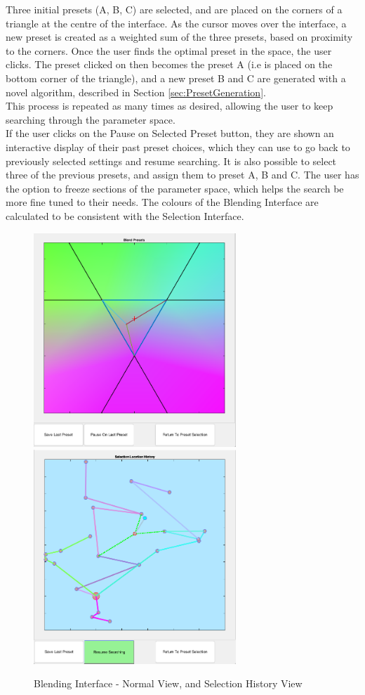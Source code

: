 \documentclass[11pt, oneside]{report}   	%
\begin{document}
Three initial presets (A, B, C) are selected, and are placed on the corners of a triangle at the centre of the interface. As the cursor moves over the interface, a new preset is created as a weighted sum of the three presets, based on proximity to the corners. Once the user finds the optimal preset in the space, the user clicks. The preset clicked on then becomes the preset A (i.e is placed on the bottom corner of the triangle), and a new preset B and C are generated with a novel algorithm, described in Section \ref{sec:PresetGeneration}. \\
This process is repeated as many times as desired, allowing the user to keep searching through the parameter space.\\
If the user clicks on the Pause on Selected Preset button, they are shown an interactive display of their past preset choices, which they can use to go back to previously selected settings and resume searching. It is also possible to select three of the previous presets, and assign them to preset A, B and C.
The user has the option to freeze sections of the parameter space, which helps the search be more fine tuned to their needs.
The colours of the Blending Interface are calculated to be consistent with the Selection Interface.
\begin{figure}[h] 
	\centering
	\hspace*{-0.2cm}
	\includegraphics[width = 3.0in]{BlendingInterface1.png}
	\hspace*{0.2cm}
	\includegraphics[width = 3.0in]{BlendingInterface2.png}
	\caption{Blending Interface - Normal View, and Selection History View}
	\label{fig:BlendingInterface}
\end{figure}
\end{document}

